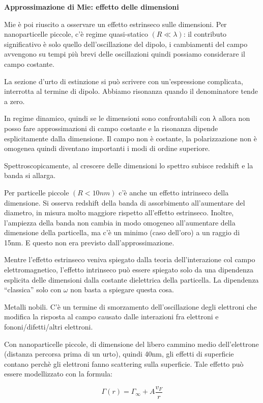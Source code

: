 \textbf{Approssimazione di Mie: effetto delle dimensioni}

Mie è poi riuscito a osservare un effetto estrinseco sulle dimensioni.
Per nanoparticelle piccole, c'è regime quasi-statico
\(\left( R \ll \lambda \right)\): il contributo significativo è solo
quello dell'oscillazione del dipolo, i cambiamenti del campo avvengono
su tempi più brevi delle oscillazioni quindi possiamo considerare il
campo costante.

La sezione d'urto di estinzione si può scrivere con un'espressione
complicata, interrotta al termine di dipolo. Abbiamo risonanza quando il
denominatore tende a zero.

In regime dinamico, quindi se le dimensioni sono confrontabili con λ
allora non posso fare approssimazioni di campo costante e la risonanza
dipende esplicitamente dalla dimensione. Il campo non è costante, la
polarizzazione non è omogenea quindi diventano importanti i modi di
ordine superiore.

Spettroscopicamente, al crescere delle dimensioni lo spettro subisce
redshift e la banda si allarga.

Per particelle piccole \(\left( R < 10nm \right)\) c'è anche un effetto
intrinseco della dimensione. Si osserva redshift della banda di
assorbimento all'aumentare del diametro, in misura molto maggiore
rispetto all'effetto estrinseco. Inoltre, l'ampiezza della banda non
cambia in modo omogeneo all'aumentare della dimensione della particella,
ma c'è un minimo (caso dell'oro) a un raggio di 15nm. E questo non era
previsto dall'approssimazione.

Mentre l'effetto estrinseco veniva spiegato dalla teoria
dell'interazione col campo elettromagnetico, l'effetto intrinseco può
essere spiegato solo da una dipendenza esplicita delle dimensioni dalla
costante dielettrica della particella. La dipendenza ``classica'' solo
con \(\omega\) non basta a spiegare questa cosa.

Metalli nobili. C'è un termine di smorzamento dell'oscillazione degli
elettroni che modifica la risposta al campo causato dalle interazioni
fra elettroni e fononi/difetti/altri elettroni.

Con nanoparticelle piccole, di dimensione del libero cammino medio
dell'elettrone (distanza percorsa prima di un urto), quindi 40nm, gli
effetti di superficie contano perchè gli elettroni fanno scattering
sulla superficie. Tale effetto può essere modellizzato con la formula:

\[\Gamma\left( r \right) = \Gamma_{\infty} + A\frac{v_{F}}{r}\]

